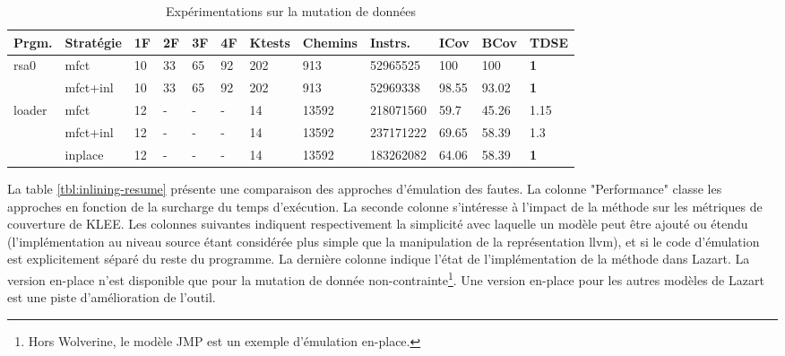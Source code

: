             \begin{table}[ht]
            \centering
            \small
            \setlength\tabcolsep{4pt} %
            \begin{tabular}{l|l|llll|lll|lll}
            Prgm. & Stratégie & 1F & 2F & 3F & 4F & Ktests & Chemins & Instrs. & ICov & BCov & TDSE \\
            \hline
            \hline
            rsa0 & mfct & 10 & 33 & 65 & 92  & 202 & 913 & 52965525 & 100 & 100 & \textbf{1} \\
            & mfct+inl & 10 & 33 & 65 & 92 & 202 & 913 & 52969338 & 98.55 & 93.02 & \textbf{1} \\
            \hline
            loader & mfct & 12 & - & - & - & 14 & 13592 & 218071560 & 59.7 & 45.26 & 1.15 \\
            & mfct+inl & 12 & - & - & - & 14 & 13592 & 237171222 & 69.65 & 58.39 & 1.3 \\
            & inplace & 12 & - & - & - & 14 & 13592 & 183262082 & 64.06 & 58.39 & \textbf{1}
            \end{tabular}
            \caption{Expérimentations sur la mutation de données}
            \label{tbl:inlining}
            \end{table}
                
            La table \ref{tbl:inlining-resume} présente une comparaison des approches d'émulation des fautes.
            La colonne "Performance" classe les approches en fonction de la surcharge du temps d'exécution.
            La seconde colonne s'intéresse à l'impact de la méthode sur les métriques de couverture de KLEE.  
            Les colonnes suivantes indiquent respectivement la simplicité avec laquelle un modèle peut être ajouté ou étendu (l'implémentation au niveau source étant considérée plus simple que la manipulation de la représentation \gls{llvm}), et si le code d'émulation est explicitement séparé du reste du programme.
            La dernière colonne indique l'état de l'implémentation de la méthode dans Lazart. La version en-place n'est disponible que pour la mutation de donnée non-contrainte\footnote{Hors Wolverine, le modèle \gls{JMP} est un exemple d'émulation en-place.}. Une version en-place pour les autres modèles de Lazart est une piste d'amélioration de l'outil.
            
